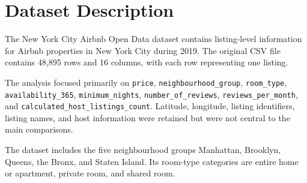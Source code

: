\section{Dataset Description}

The New York City Airbnb Open Data dataset contains listing-level information
for Airbnb properties in New York City during 2019. The original CSV file
contains 48,895 rows and 16 columns, with each row representing one listing.

The analysis focused primarily on \texttt{price},
\texttt{neighbourhood\_group}, \texttt{room\_type},
\texttt{availability\_365}, \texttt{minimum\_nights},
\texttt{number\_of\_reviews}, \texttt{reviews\_per\_month}, and
\texttt{calculated\_host\_listings\_count}. Latitude, longitude, listing
identifiers, listing names, and host information were retained but were not
central to the main comparisons.

The dataset includes the five neighbourhood groups Manhattan, Brooklyn,
Queens, the Bronx, and Staten Island. Its room-type categories are entire
home or apartment, private room, and shared room. 